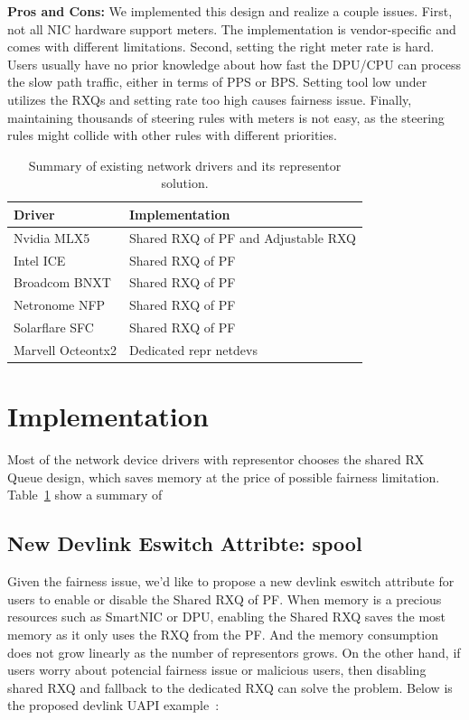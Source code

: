 \documentclass[letterpaper]{article}
\begin{document}
\textbf{Pros and Cons:} We implemented this design and realize a couple issues.
First, not all NIC hardware support meters. The implementation is vendor-specific
and comes with different limitations. Second, setting the right meter rate is hard.
Users usually have no prior knowledge
about how fast the DPU/CPU can process the slow path traffic, either in terms of
PPS or BPS. Setting tool low under utilizes the RXQs and setting rate too high
causes fairness issue.
Finally, maintaining thousands of steering rules with meters is not easy, as the
steering rules might collide with other rules with different priorities.

\begin{table}[h!]
\centering
\footnotesize
\begin{tabular}{|l|p{3.6cm}|} \hline
\textbf{Driver} &  \textbf{Implementation}\\ \hline \hline
Nvidia MLX5 & Shared RXQ of PF and \newline Adjustable RXQ \\ \hline
Intel ICE & Shared RXQ of PF~\cite{icepatch} \\ \hline
Broadcom BNXT & Shared RXQ of PF ~\cite{survey} \\ \hline
Netronome NFP & Shared RXQ of PF~\cite{survey} \\ \hline
Solarflare SFC & Shared RXQ of PF~\cite{survey} \\ \hline
Marvell Octeontx2 & Dedicated repr netdevs~\cite{octeontx2} \\ \hline
\end{tabular}
\caption{Summary of existing network drivers and its representor solution.}
\label{tab:vendors}
\end{table}

\section{Implementation}
Most of the network device drivers with representor chooses the shared
RX Queue design, which saves memory at the price of possible
fairness limitation. Table~\ref{tab:vendors} show a summary of 

\subsection{New Devlink Eswitch Attribte: spool}
Given the fairness issue, we'd like to propose a new devlink eswitch attribute
for users to enable or disable the Shared RXQ of PF.
When memory is a precious resources such as SmartNIC or DPU, enabling the Shared RXQ
saves the most memory as it only uses the RXQ from the PF. And the memory consumption
does not grow linearly as the number of representors grows.
On the other hand, if users worry about potencial fairness issue or malicious users,
then disabling shared RXQ and fallback to the dedicated RXQ can solve the problem.
Below is the proposed devlink UAPI example~\cite{spool}:
\end{document}
